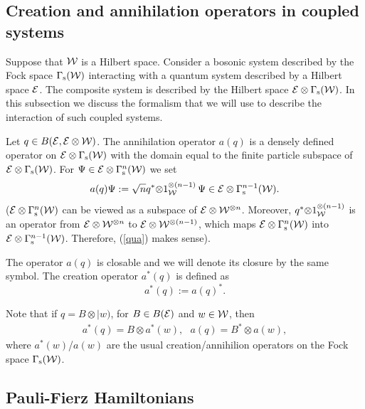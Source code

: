\documentclass{svmult}
\newcommand{\beq}{\begin{equation}}
\newcommand{\eeq}{\end{equation}}
\def\s{{\rm s}}
\def\cB{{ B}}
\def\cE{{\cal E}}
\def\cW{{\cal W}}
\def\s{{\rm s}}
\begin{document}
\subsection{Creation  and annihilation operators in coupled systems}
\label{s4.1}





Suppose that $\cW$ is a Hilbert space. Consider a
 bosonic  system described by the Fock space $\Gamma_\s(\cW)$
 interacting  with a  quantum system
described by a Hilbert space $\cE$. The composite system is
 described by the Hilbert space $\cE\otimes\Gamma_\s(\cW)$. In this
 subsection we discuss the  formalism that we will use  to describe the 
interaction of such coupled systems.






Let $q\in
\cB(\cE,\cE\otimes\cW)$.
The annihilation operator   $a(q)$ is  a densely defined operator on
$\cE\otimes\Gamma_\s(\cW)$ with the domain equal to the finite particle 
subspace of
$\cE\otimes\Gamma_\s(\cW)$. For $\Psi\in\cE\otimes\Gamma_\s^n(\cW)$ we set
\beq
a(q)\Psi:
=\sqrt{n}q^*{\otimes
}1_\cW^{\otimes(n-1)}\,\Psi\in\cE\otimes\Gamma_\s^{n-1}(\cW) .\label{qua}\eeq
($\cE\otimes\Gamma_\s^n(\cW)$  can be viewed as a subspace of
$\cE\otimes\cW^{\otimes n}$. Moreover, $q^*{\otimes
}1_\cW^{\otimes(n-1)}$ is an operator from
$\cE\otimes\cW^{\otimes n}$ to $\cE\otimes\cW^{\otimes (n-1)}$, which maps
$\cE\otimes\Gamma_\s^n(\cW)$ into $\cE\otimes\Gamma_\s^{n-1}(\cW)$. Therefore,
(\ref{qua}) makes sense).

The operator $a(q)$ is closable and we will denote its closure by the same
symbol. The creation operator $a^*(q)$ is defined as
\[a^*(q):=a(q)^*.\]




Note 
that if $q=B\otimes|w)$, for  $B\in \cB(\cE)$ and $w\in\cW$,
then
\[\begin{array}{l}a^*(q)=B{\otimes} a^*(w),\ \ \ 
a(q)=B^*{\otimes}a(w),\end{array}\]
where $a^*(w)$/$a(w)$ are the usual creation/annihilion operators on the Fock
space $\Gamma_\s(\cW)$.


\subsection{Pauli-Fierz Hamiltonians}


\end{document}
